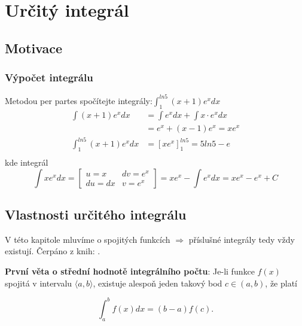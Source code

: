 \chapter{Určitý integrál}
\minitoc
\newpage  
\section{Motivace} 
      

\subsection{Výpočet integrálu}
    \begin{example}Metodou per partes spočítejte integrály:$\displaystyle\int_1^{ln5}{(x+1)e^xdx}$
      \begin{align*}
        \int{(x+1)e^xdx} &= \int{e^xdx}+\int{x\cdot e^xdx} \\
                         &= e^x + (x-1)e^x = xe^x \\
        \int_1^{ln5}{(x+1)e^xdx} &= [xe^x]_1^{ln5} = 5ln5-e\\
      \end{align*}
      kde integrál
      \begin{equation*}
          \int{xe^xdx}=
            \left[\begin{array}{cc}
              u=x   & dv=e^x \\
              du=dx & v=e^x
            \end{array}\right]=
            xe^x-\int{e^xdx} = xe^x - e^x+C
      \end{equation*}
    \end{example}

\newpage
\section{Vlastnosti určitého integrálu}
  V této kapitole mluvíme o spojitých funkcích $\Rightarrow$ příslušné integrály tedy vždy
  existují. Čerpáno z knih:
  \cite{Knichal}.

  \begin{lemma}
    \textbf{První věta o střední hodnotě integrálního počtu}: Je-li funkce $f(x)$ spojitá v
    intervalu $\langle a, b\rangle$, existuje alespoň jeden takový bod $c\in(a, b)$, že platí

    \begin{equation}\label{MA:eq_av1}
      \int_a^b f(x)dx = (b-a)f(c).
    \end{equation}
  \end{lemma}

